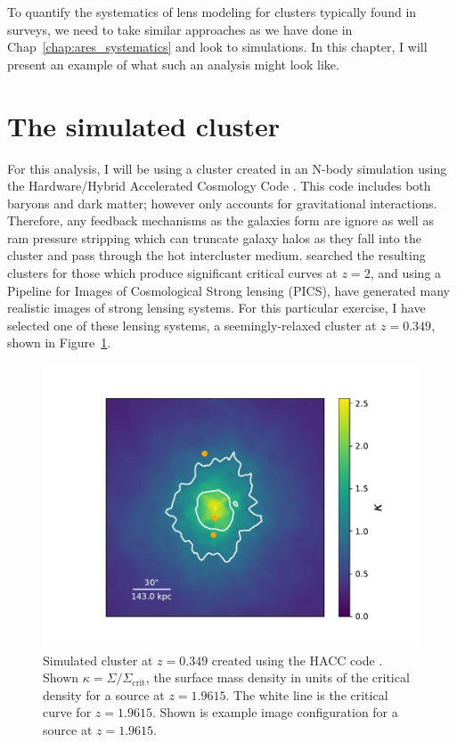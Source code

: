 To quantify the systematics of lens modeling for clusters typically found in surveys, we need to take similar approaches as we have done in Chap~\ref{chap:ares_systematics} and look to simulations. In this chapter, I will present an example of what such an analysis might look like.

\section{The simulated cluster}

For this analysis, I will be using a cluster created in an N-body simulation using the Hardware/Hybrid Accelerated Cosmology Code \citep[HACC; ][]{Habib:2016cy}. This code includes both baryons and dark matter; however only accounts for gravitational interactions. Therefore, any feedback mechanisms as the galaxies form are ignore as well as ram pressure stripping which can truncate galaxy halos as they fall into the cluster and pass through the hot intercluster medium. \citet{Li:2016ek} searched the resulting clusters for those which produce significant critical curves at $z=2$, and using a Pipeline for Images of Cosmological Strong lensing (PICS), have generated many realistic images of strong lensing systems. For this particular exercise, I have selected one of these lensing systems, a seemingly-relaxed cluster at $z=0.349$, shown in Figure~\ref{chap6:fig:cluster}.

\begin{figure}
\centering
\includegraphics[width=\textwidth,trim={0 33pt 0 40pt},clip]{Chap6/cluster.pdf}
\caption[Simulated cluster from created using HACC]{Simulated cluster at $z=0.349$ created using the HACC code \citep{Habib:2016cy}. Shown $\kappa=\Sigma/\Sigma_\mathrm{crit}$, the surface mass density in units of the critical density for a source at $z=1.9615$. The white line is the critical curve for $z=1.9615$. Shown is example image configuration for a source at $z=1.9615$.}
\label{chap6:fig:cluster}
\end{figure}


